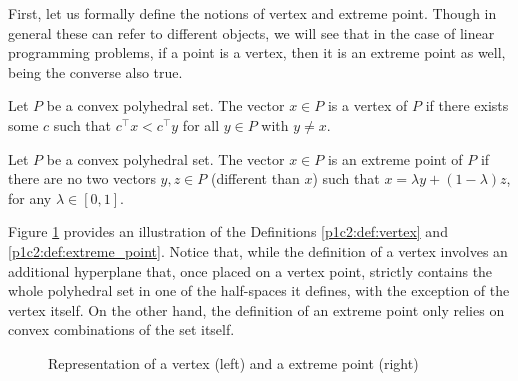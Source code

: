 First, let us formally define the notions of vertex and extreme point. Though in general these can refer to different objects, we will see that in the case of linear programming problems, if a point is a vertex, then it is an extreme point as well, being the converse also true.

\begin{definition}[Vertex] \label{p1c2:def:vertex}
	Let $P$ be a convex polyhedral set. The vector $x \in P$ is a vertex of $P$ if there exists some $c$ such that $c^\top x < c^\top y$ for all $y \in P$ with $y \neq x$.
\end{definition}

\begin{definition}\label{p1c2:def:extreme_point}
	Let $P$ be a convex polyhedral set. The vector $x \in P$ is an extreme point of $P$ if there are no two vectors $y,z \in P$ (different than $x$) such that $x = \lambda y + (1 - \lambda)z$, for any $\lambda \in [0,1]$.
\end{definition}

Figure \ref{p1c2:fig:vertex_and_extreme_point} provides an illustration of the Definitions \ref{p1c2:def:vertex} and \ref{p1c2:def:extreme_point}. Notice that, while the definition of a vertex involves an additional hyperplane that, once placed on a vertex point, strictly contains the whole polyhedral set in one of the half-spaces it defines, with the exception of the vertex itself. On the other hand, the definition of an extreme point only relies on convex combinations of the set itself. 

\begin{figure}
	\caption{Representation of a vertex (left) and a extreme point (right)} \label{p1c2:fig:vertex_and_extreme_point}
\end{figure}	

